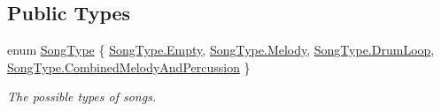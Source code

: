\subsection*{Public Types}
\begin{DoxyCompactItemize}
\item 
enum \hyperlink{group___song_enums_gae681a1f001333e39fc1cb4fea97bfe1b}{Song\+Type} \{ \hyperlink{group___song_enums_ggae681a1f001333e39fc1cb4fea97bfe1bace2c8aed9c2fa0cfbed56cbda4d8bf07}{Song\+Type.\+Empty}, 
\hyperlink{group___song_enums_ggae681a1f001333e39fc1cb4fea97bfe1bace2f3a5579d231b3b8f8b9e5fc46d361}{Song\+Type.\+Melody}, 
\hyperlink{group___song_enums_ggae681a1f001333e39fc1cb4fea97bfe1ba150deef06b13ddaeac61d0d2699ec61e}{Song\+Type.\+Drum\+Loop}, 
\hyperlink{group___song_enums_ggae681a1f001333e39fc1cb4fea97bfe1ba5130447d9fcb867ce341b3d17b117ced}{Song\+Type.\+Combined\+Melody\+And\+Percussion}
 \}\begin{DoxyCompactList}\small\item\em The possible types of songs. \end{DoxyCompactList}
\end{DoxyCompactItemize}
